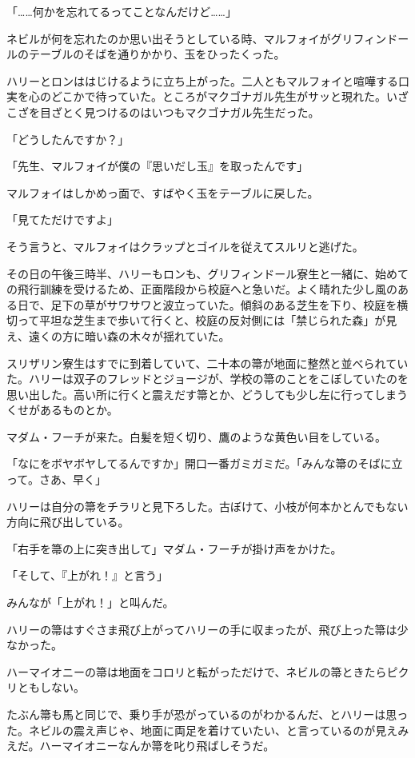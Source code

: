 \documentclass[10pt,a4paper]{article}
\begin{document}
\begin{CJK}{UTF8}{min}
「……何かを忘れてるってことなんだけど……」

ネビルが何を忘れたのか思い出そうとしている時、マルフォイがグリフィンドールのテーブルのそばを通りかかり、玉をひったくった。

ハリーとロンははじけるように立ち上がった。二人ともマルフォイと喧嘩する口実を心のどこかで待っていた。ところがマクゴナガル先生がサッと現れた。いざこざを目ざとく見つけるのはいつもマクゴナガル先生だった。

「どうしたんですか？」

「先生、マルフォイが僕の『思いだし玉』を取ったんです」

マルフォイはしかめっ面で、すばやく玉をテーブルに戻した。

「見てただけですよ」

そう言うと、マルフォイはクラップとゴイルを従えてスルリと逃げた。



その日の午後三時半、ハリーもロンも、グリフィンドール寮生と一緒に、始めての飛行訓練を受けるため、正面階段から校庭へと急いだ。よく晴れた少し風のある日で、足下の草がサワサワと波立っていた。傾斜のある芝生を下り、校庭を横切って平坦な芝生まで歩いて行くと、校庭の反対側には「禁じられた森」が見え、遠くの方に暗い森の木々が揺れていた。

スリザリン寮生はすでに到着していて、二十本の箒が地面に整然と並べられていた。ハリーは双子のフレッドとジョージが、学校の箒のことをこぼしていたのを思い出した。高い所に行くと震えだす箒とか、どうしても少し左に行ってしまうくせがあるものとか。

マダム・フーチが来た。白髪を短く切り、鷹のような黄色い目をしている。

「なにをボヤボヤしてるんですか」開口一番ガミガミだ。「みんな箒のそばに立って。さあ、早く」

ハリーは自分の箒をチラリと見下ろした。古ぼけて、小枝が何本かとんでもない方向に飛び出している。

「右手を箒の上に突き出して」マダム・フーチが掛け声をかけた。

「そして、『上がれ！』と言う」

みんなが「上がれ！」と叫んだ。

ハリーの箒はすぐさま飛び上がってハリーの手に収まったが、飛び上った箒は少なかった。

ハーマイオニーの箒は地面をコロリと転がっただけで、ネビルの箒ときたらピクリともしない。

たぶん箒も馬と同じで、乗り手が恐がっているのがわかるんだ、とハリーは思った。ネビルの震え声じゃ、地面に両足を着けていたい、と言っているのが見えみえだ。ハーマイオニーなんか箒を叱り飛ばしそうだ。


\end{CJK}
\end{document}
